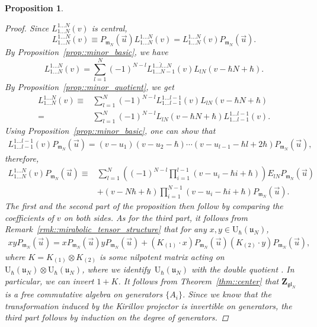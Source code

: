 \documentclass[10pt,a4paper]{amsart}
\numberwithin{equation}{section}
\newtheorem{Proposition}[Theorem]{Proposition}
{ \theoremstyle{definition}
	\newtheorem{Definition}[Theorem]{Definition}
	\newtheorem{Note}[Theorem]{Note}
	\newtheorem{Example}[Theorem]{Example}
	\newtheorem{Remark}[Theorem]{Remark} }
\newcommand{\U}{\mathrm{U}_{\hbar}}
\newcommand{\Z}{\mathbf{Z}}
\renewcommand{\b}{\mathfrak{b}}
\newcommand{\n}{\mathfrak{n}}
\renewcommand{\u}{\mathfrak{u}}
\newcommand{\m}{\mathfrak{m}}
\newcommand{\gl}{\mathfrak{gl}}
\begin{document}
\begin{Proposition}
\begin{proof}
			Since $L_{1\dots N}^{1\dots N}(v)$ is central,
			\[
			L_{1\dots N}^{1\dots N}(v) \equiv P_{\m_N} (\vec{u}) L_{1\dots N}^{1\dots N}(v) = L_{1\dots N}^{1\dots N}(v) P_{\m_N} (\vec{u}).
			\]
			By Proposition~\ref{prop::minor_basic}, we have
			\[
			L_{1\dots N}^{1\dots N}(v) = \sum\limits_{l=1}^N (-1)^{N-l} L_{1\dots N-1}^{1\dots \hat{l} \dots N}(v) L_{lN}(v-\hbar N+\hbar).
			\]
			By Proposition~\ref{prop::minor_quotient}, we get
			\begin{align*}
				L_{1\dots N}^{1\dots N}(v) \equiv{} &\sum\limits_{l=1}^N (-1)^{N-l} L_{1\dots l-1}^{1\dots l-1}(v) L_{lN}(v-\hbar N+\hbar) \\
				={}&\sum\limits_{l=1}^N (-1)^{N-l} L_{lN}(v-\hbar N+\hbar) L_{1\dots l-1}^{1\dots l-1}(v).
			\end{align*}
			Using Proposition~\ref{prop::minor_basic}, one can show that
			\begin{align*}
				L_{1\dots l-1}^{1\dots l-1}(v) P_{\m_N} (\vec{u})=(v-u_1) (v-u_2-\hbar) \cdots (v-u_{l-1} - \hbar l+2\hbar) P_{\m_N} (\vec{u}),
			\end{align*}
			therefore,
			\begin{align*}
					L_{1\dots N}^{1\dots N}(v) P_{\m_N} (\vec{u}) \equiv{}& \sum_{l=1}^N \left((-1)^{N-l} \prod_{i=1}^{l-1}(v-u_i - \hbar i+\hbar) \right) E_{lN} P_{\m_N} (\vec{u}) \\
					&+(v-N\hbar + \hbar)\prod_{i=1}^{N-1}(v - u_i -\hbar i + \hbar) P_{\m_N} (\vec{u}).
			\end{align*}
			The first and the second part of the proposition then follow by comparing the coefficients of $v$ on both sides. As for the third part, it follows from Remark~\ref{rmk::mirabolic_tensor_structure} that for any $x,y\in \U(\u_N)$,
			\begin{align*}
				xy P_{\m_N}(\vec{u}) = x P_{\m_N}(\vec{u}) y P_{\m_N}(\vec{u}) + (K_{(1)} \cdot x) P_{\m_N}(\vec{u}) (K_{(2)} \cdot y) P_{\m_N}(\vec{u}),
			\end{align*}
			where $K = K_{(1)} \otimes K_{(2)}$ is some nilpotent matrix acting on $\U(\u_N) \otimes \U(\u_N)$, where we identify~$\U(\u_N)$ with the double quotient \smash{$\n_-^{\psi} \backslash \U(\gl_N) / \b^{\vec{u}}$}. In particular, we can invert $1 + K$. It follows from Theorem~\ref{thm::center} that $\Z_{\gl_N}$ is a free commutative algebra on generators $\{A_i\}$. Since we know that the transformation induced by the Kirillov projector is invertible on generators, the third part follows by induction on the degree of generators.
		\end{proof}
	\end{Proposition}
	
\end{document}
